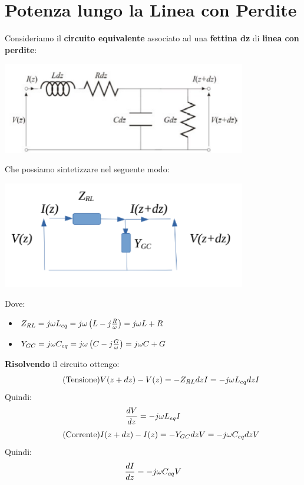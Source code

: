 \chapter{Potenza lungo la Linea con Perdite}
Consideriamo il\textbf{ circuito equivalente} associato ad 
una \textbf{fettina dz} di \textbf{linea con perdite}:
\begin{center}
    \includegraphics[width=0.8\textwidth]{Images/figure16.png}
\end{center}
Che possiamo sintetizzare nel seguente modo:
\begin{center}
    \includegraphics[width=0.8\textwidth]{Images/figure17.png}
\end{center}
Dove:
\begin{itemize}
    \item $Z_{RL} = j\omega L_{eq}= j\omega \left(L -     j\frac{R}{\omega}  \right) = j\omega L + R$
    \item $Y_{GC} = j\omega C_{eq}= j\omega \left(C -     j\frac{G}{\omega}  \right) = j\omega C + G$
\end{itemize}
\textbf{Risolvendo} il circuito ottengo:
\begin{equation*}
\tag{Tensione}
    V(z + dz) - V(z) = -Z_{RL} dz I = - j \omega L_{eq} dz I
\end{equation*}
Quindi:
\begin{equation*}
    \frac{dV}{dz} = - j \omega L_{eq} I
\end{equation*}
\begin{equation*}
\tag{Corrente}
    I(z + dz) - I(z) = -Y_{GC} dz V = - j \omega C_{eq} dz V
\end{equation*}
Quindi:
\begin{equation*}
    \frac{dI}{dz} = - j \omega C_{eq} V
\end{equation*}
